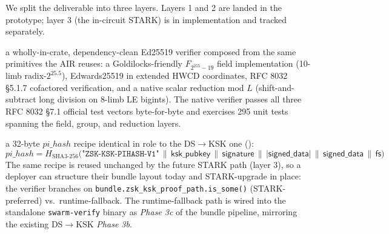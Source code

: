 \documentclass[11pt,a4paper]{article}
\theoremstyle{definition}
\theoremstyle{plain}
\newcommand{\hash}{\ensuremath{H}}
\begin{document}
We split the deliverable into three layers.  Layers 1 and 2 are
landed in the prototype; layer 3 (the in-circuit STARK) is in
implementation and tracked separately.

\begin{description}[leftmargin=2em,style=nextline]
  \item[Layer 1 — \emph{Native verifier} (this work):]
        a wholly-in-crate, dependency-clean Ed25519 verifier composed
        from the same primitives the AIR reuses: a Goldilocks-friendly
        $F_{2^{255}-19}$ field implementation (10-limb radix-$2^{25.5}$),
        Edwards25519 in extended HWCD coordinates, RFC 8032 \S5.1.7
        cofactored verification, and a native scalar reduction mod $L$
        (shift-and-subtract long division on 8-limb LE bigints).
        The native verifier passes all three RFC 8032 \S7.1 official
        test vectors byte-for-byte and exercises 295 unit tests
        spanning the field, group, and reduction layers.

  \item[Layer 2 — \emph{Public-input commitment} (this work):]
        a 32-byte $\mathit{pi\_hash}$ recipe identical in role to the
        DS$\to$KSK one ():
        \begin{equation}
          \mathit{pi\_hash} = \hash_{\mathrm{SHA3\text{-}256}}\!\bigl(
            \texttt{"ZSK-KSK-PIHASH-V1"}
          \,\|\, \mathsf{ksk\_pubkey}
          \,\|\, \mathsf{signature}
          \,\|\, \mathsf{|signed\_data|}
          \,\|\, \mathsf{signed\_data}
          \,\|\, \mathsf{fs}
          \bigr)
          \nonumber
        \end{equation}
        The same recipe is reused unchanged by the future STARK path
        (layer 3), so a deployer can structure their bundle layout
        today and STARK-upgrade in place: the verifier branches on
        \texttt{bundle.zsk\_ksk\_proof\_path.is\_some()} (STARK-preferred)
        vs.\ runtime-fallback.  The runtime-fallback path is wired into
        the standalone \texttt{swarm-verify} binary as \emph{Phase 3c}
        of the bundle pipeline, mirroring the existing DS$\to$KSK
        \emph{Phase 3b}.


\end{description}
\end{document}
